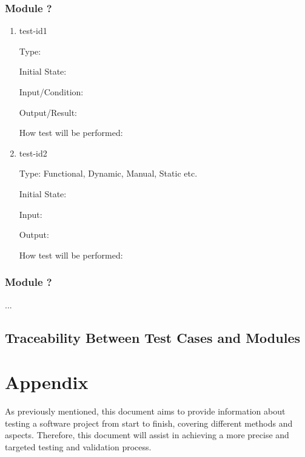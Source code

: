 \documentclass[12pt, titlepage]{article}
\begin{document}
\subsubsection{Module ?}
		
\begin{enumerate}

\item{test-id1\\}

Type: 
					
Initial State: 
					
Input/Condition: 
					
Output/Result: 
					
How test will be performed: 
					
\item{test-id2\\}

Type: Functional, Dynamic, Manual, Static etc.
					
Initial State: 
					
Input: 
					
Output: 
					
How test will be performed: 

\end{enumerate}

\subsubsection{Module ?}

...

\subsection{Traceability Between Test Cases and Modules}

				




\newpage

\section{Appendix}

As previously mentioned, this document aims to provide information about testing a software project from start to finish, covering different methods and aspects. Therefore, this document will assist in achieving a more precise and targeted testing and validation process.
\end{document}
